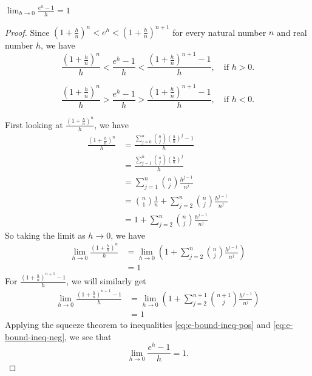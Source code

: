 \begin{lemma}
    \( \lim_{h \to 0} \frac{e^{h}-1}{h} =1\)
\end{lemma}
\begin{proof}
    Since \( \left( 1 + \frac{h }{n} \right)^{n} < e^{h} < \left( 1 + \frac{ h }{n } \right)^{n+1} \) for every natural number \( n \) and real number \( h \), we have 
  \begin{equation}\label{eq:e-bound-ineq-pos}
\frac{\left( 1 + \tfrac{h}{n} \right)^{n}}{h} 
   < \frac{e^{h} - 1}{h} 
   < \frac{\left( 1 + \tfrac{h}{n} \right)^{n+1} - 1}{h},
   \quad \text{if } h > 0.
\end{equation}

\begin{equation}\label{eq:e-bound-ineq-neg}
\frac{\left( 1 + \tfrac{h}{n} \right)^{n}}{h} 
   > \frac{e^{h} - 1}{h} 
   > \frac{\left( 1 + \tfrac{h}{n} \right)^{n+1} - 1}{h},
   \quad \text{if } h < 0.
\end{equation}

    First looking at \( \frac{\left( 1 + \frac{h }{n} \right)^{n} }{h}  \), we have 
    \begin{align*}
       \frac{\left( 1 + \frac{h }{n} \right)^{n} }{h}  &= \frac{\displaystyle \sum_{j=0}^{n} {n \choose j} \left( \frac{h }{n} \right)^{j} -1 }{h} \\
       &= \frac{\displaystyle \sum_{j=1}^{n} {n \choose j} \left( \frac{h }{n} \right)^{j} }{h} \\
       &=  \sum_{j=1}^{n} {n \choose j} \frac{h^{j-1}}{n^{j}}\\
       &= {n \choose 1} \frac{1}{n} + \sum_{j=2}^{n} {n \choose j} \frac{h^{j-1}}{n^{j}} \\
       &= 1 +  \sum_{j=2}^{n} {n \choose j} \frac{h^{j-1}}{n^{j}}
    \end{align*}
    So taking the limit as \( h \to 0 \), we have 
    \begin{align*}
         \lim_{ h \to 0}  \frac{\left( 1 + \frac{h }{n} \right)^{n} }{h} &= \lim_{h \to 0 } \left(  1 +  \sum_{j=2}^{n} {n \choose j} \frac{h^{j-1}}{n^{j}} \right) \\
         &=1
    \end{align*}
For \( \frac{\left( 1 + \tfrac{h}{n} \right)^{n+1} - 1}{h} \), we will similarly get 
\begin{align*}
         \lim_{ h \to 0}  \frac{\left( 1 + \frac{h }{n} \right)^{n+1} -1}{h} &= \lim_{h \to 0 } \left(  1 + \sum_{j=2}^{n+1} {n+1 \choose j} \frac{h^{j-1}}{n^{j}} \right) \\
         &=1
    \end{align*}
    Applying the squeeze theorem to inequalities \eqref{eq:e-bound-ineq-pos} and \eqref{eq:e-bound-ineq-neg}, we see that
    \[ \boxed{\lim_{h \to 0} \frac{e^{h}-1}{h} =1}. \]
\end{proof}

